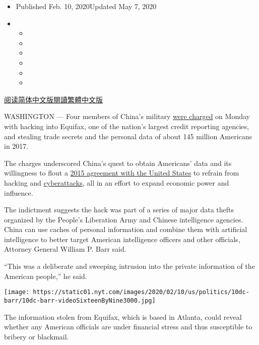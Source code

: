 \begin{itemize}
\item
  Published Feb. 10, 2020Updated May 7, 2020
\item
  \begin{itemize}
  \item
  \item
  \item
  \item
  \item
  \item
  \end{itemize}
\end{itemize}

\href{https://cn.nytimes.com/usa/20200211/equifax-hack-china/}{阅读简体中文版}\href{https://cn.nytimes.com/usa/20200211/equifax-hack-china/zh-hant/}{閱讀繁體中文版}

WASHINGTON --- Four members of China's military
\href{https://www.justice.gov/opa/press-release/file/1246891/download}{were
charged} on Monday with hacking into Equifax, one of the nation's
largest credit reporting agencies, and stealing trade secrets and the
personal data of about 145 million Americans in 2017.

The charges underscored China's quest to obtain Americans' data and its
willingness to flout a
\href{https://www.nytimes.com/2015/09/26/world/asia/xi-jinping-white-house.html}{2015
agreement with the United States} to refrain from hacking and
\href{https://www.nytimes.com/2020/05/07/world/asia/china-hacking-military-aria.html}{cyberattacks},
all in an effort to expand economic power and influence.

The indictment suggests the hack was part of a series of major data
thefts organized by the People's Liberation Army and Chinese
intelligence agencies. China can use caches of personal information and
combine them with artificial intelligence to better target American
intelligence officers and other officials, Attorney General William P.
Barr said.

``This was a deliberate and sweeping intrusion into the private
information of the American people,'' he said.

\texttt{[image: https://static01.nyt.com/images/2020/02/10/us/politics/10dc-barr/10dc-barr-videoSixteenByNine3000.jpg]}

The information stolen from Equifax, which is based in Atlanta, could
reveal whether any American officials are under financial stress and
thus susceptible to bribery or blackmail.


